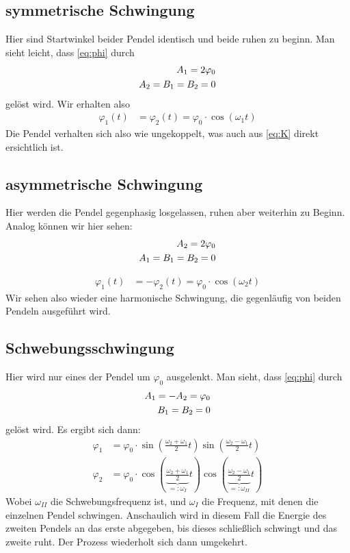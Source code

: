\subsection{symmetrische Schwingung}
Hier sind Startwinkel beider Pendel identisch und beide ruhen zu beginn. Man sieht leicht, dass \eqref{eq:phi} durch 
\begin{align}
A_1=2\varphi_0 \notag \\ A_2=B_1=B_2=0
\end{align}
gelöst wird. Wir erhalten also 
\begin{align}
	\varphi_{1}(t) &= \varphi_{2}(t) = \varphi_0\cdot \cos(\omega_1t)
\end{align} 
Die Pendel verhalten sich also wie ungekoppelt, was auch aus \eqref{eq:K} direkt ersichtlich ist.
\subsection{asymmetrische Schwingung}
Hier werden die Pendel gegenphasig losgelassen, ruhen aber weiterhin zu Beginn. Analog können wir hier sehen:
\begin{align}
A_2=2\varphi_0 \notag \\ A_1=B_1=B_2=0
\end{align}

\begin{align}
	\varphi_{1}(t) &= - \varphi_{2}(t) = \varphi_0\cdot \cos(\omega_2t)
\end{align} 
Wir sehen also wieder eine harmonische Schwingung, die gegenläufig von beiden Pendeln ausgeführt wird.
\subsection{Schwebungsschwingung}
Hier wird nur eines der Pendel um $\varphi_0$ ausgelenkt. 
Man sieht, dass \eqref{eq:phi} durch 
\begin{align}
A_1=-A_2=\varphi_0 \notag \\ B_1=B_2=0
\end{align}
gelöst wird. Es ergibt sich dann:
\begin{align}
\varphi_1&=\varphi_0\cdot \sin(\frac{\omega_2+\omega_1}2t)\sin(\frac{\omega_2-\omega_1}2t) \\ \varphi_2&=\varphi_0\cdot \cos(\underbrace{\frac{\omega_2+\omega_1}2}_{=:\omega_{I}}t)\cos(\underbrace{\frac{\omega_2-\omega_1}2}_{=:\omega_{II}}t)
\label{eq:Normfr}
\end{align}
Wobei $\omega_{II}$ die Schwebungsfrequenz ist, und $\omega_{I}$ die Frequenz, mit denen die einzelnen Pendel schwingen.
Anschaulich wird in diesem Fall die Energie des zweiten Pendels an das erste abgegeben, bis dieses schließlich schwingt und das zweite ruht. Der Prozess wiederholt sich dann umgekehrt. 
